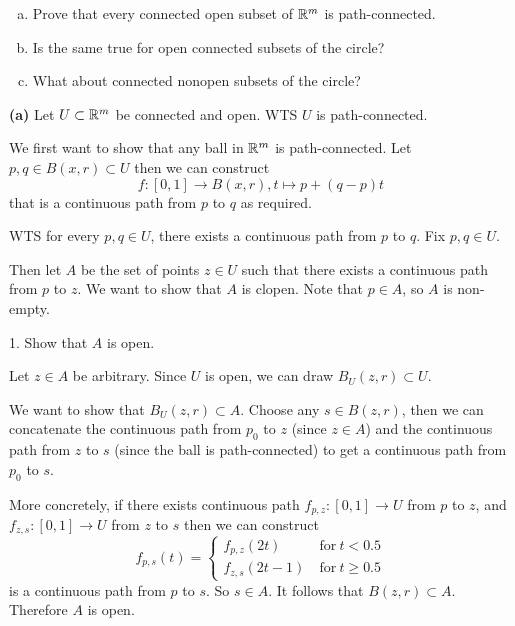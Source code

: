 \documentclass[a4paper, 12pt]{article}
\begin{document}
\begin{problem} [2.66]
$\ $
\begin{enumerate} [(a)]
    \item Prove that every connected open subset of $\mathbb{R}^m$ is path-connected.
    \item Is the same true for open connected subsets of the circle?
    \item What about connected nonopen subsets of the circle?
\end{enumerate}
\end{problem}
\begin{solution}

    \textbf{(a)}
    Let $U \subset \mathbb{R}^m$ be connected and open. WTS $U$ is path-connected.

    We first want to show that any ball in $\mathbb{R}^m$ is path-connected. Let $p, q \in B(x, r) \subset U$ then we can construct \[
        f: [0, 1] \to B(x, r), t \mapsto p + (q-p)t
    \]
    that is a continuous path from $p$ to $q$ as required.

    WTS for every $p, q \in U$, there exists a continuous path from $p$ to $q$. Fix $p, q \in U$.
    
    Then let $A$ be the set of points $z \in U$ such that there exists a continuous path from $p$ to $z$. We want to show that $A$ is clopen. Note that $p \in A$, so $A$ is non-empty.

    1. Show that $A$ is open.
    
    Let $z \in A$ be arbitrary. Since $U$ is open, we can draw $B_U(z, r) \subset U$.
    
    We want to show that $B_U(z, r) \subset A$. Choose any $s \in B(z, r)$, then we can concatenate the continuous path from $p_0$ to $z$ (since $z \in A$) and the continuous path from $z$ to $s$ (since the ball is path-connected) to get a continuous path from $p_0$ to $s$.
    
    More concretely, if there exists continuous path $f_{p, z}: [0, 1] \to U$ from $p$ to $z$, and $ f_{z, s}: [0, 1] \to U$ from $z$ to $s$ then we can construct \[
        f_{p, s}(t) = \begin{cases}
            f_{p, z} (2t) & \:\text{for}\: t < 0.5    \\
            f_{z, s} (2t-1) & \:\text{for}\: t \geq 0.5
        \end{cases}
    \]
    is a continuous path from $p$ to $s$. So $s \in A$. It follows that $B(z, r) \subset A$. Therefore $A$ is open.


\end{solution}
\end{document}
